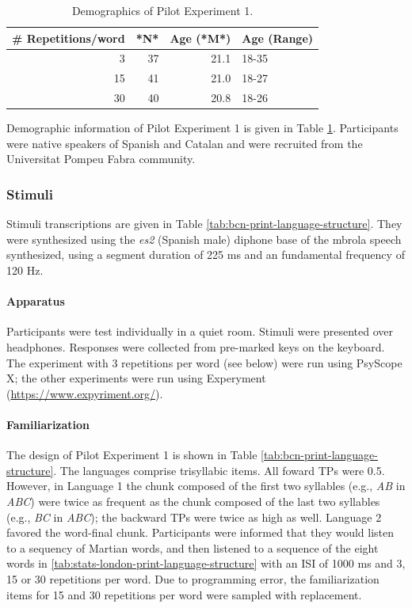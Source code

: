 \documentclass[]{article}
\let\oldparagraph\paragraph
\renewcommand{\paragraph}[1]{\oldparagraph{#1}\mbox{}}
\begin{document}
\begin{table}

\caption{\label{tab:bcn-demographics}Demographics of Pilot Experiment 1.}
\centering
\begin{tabular}[t]{rrrl}
\toprule
\# Repetitions/word & *N* & Age (*M*) & Age (Range)\\
\midrule
3 & 37 & 21.1 & 18-35\\
15 & 41 & 21.0 & 18-27\\
30 & 40 & 20.8 & 18-26\\
\bottomrule
\end{tabular}
\end{table}

Demographic information of Pilot Experiment 1 is given in Table
\ref{tab:bcn-demographics}. Participants were native speakers of Spanish
and Catalan and were recruited from the Universitat Pompeu Fabra
community.

\subsubsection{Stimuli}\label{stimuli-1}

Stimuli transcriptions are given in Table
\ref{tab:bcn-print-language-structure}. They were synthesized using the
\emph{es2} (Spanish male) diphone base of the mbrola \citep{mbrola}
speech synthesized, using a segment duration of 225 ms and an
fundamental frequency of 120 Hz.

\paragraph{Apparatus}\label{apparatus-1}

Participants were test individually in a quiet room. Stimuli were
presented over headphones. Responses were collected from pre-marked keys
on the keyboard. The experiment with 3 repetitions per word (see below)
were run using PsyScope X; the other experiments were run using
Experyment (\url{https://www.expyriment.org/}).

\paragraph{Familiarization}\label{familiarization-1}

The design of Pilot Experiment 1 is shown in Table
\ref{tab:bcn-print-language-structure}. The languages comprise
trisyllabic items. All foward TPs were 0.5. However, in Language 1 the
chunk composed of the first two syllables (e.g., \emph{AB} in
\emph{ABC}) were twice as frequent as the chunk composed of the last two
syllables (e.g., \emph{BC} in \emph{ABC}); the backward TPs were twice
as high as well. Language 2 favored the word-final chunk. Participants
were informed that they would listen to a sequency of Martian words, and
then listened to a sequence of the eight words in
\ref{tab:stats-london-print-language-structure} with an ISI of 1000 ms
and 3, 15 or 30 repetitions per word. Due to programming error, the
familiarization items for 15 and 30 repetitions per word were sampled
with replacement.
\end{document}
